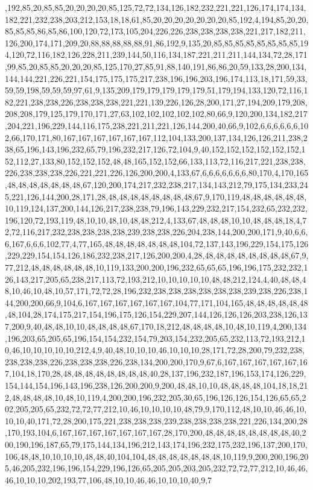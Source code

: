 ,192,85,20,85,85,20,20,20,20,85,125,72,72,134,126,182,232,221,221,126,174,174,134,182,221,232,238,203,212,153,18,18,61,85,20,20,20,20,20,20,20,85,192,4,194,85,20,20,85,85,85,86,85,86,100,120,72,173,105,204,226,226,238,238,238,238,221,217,182,211,126,200,174,171,209,20,88,88,88,88,88,91,86,192,9,135,20,85,85,85,85,85,85,85,85,194,120,72,116,182,126,228,211,239,144,50,116,134,187,221,211,211,144,134,72,28,171,99,85,20,85,85,20,20,20,85,125,170,27,85,91,88,140,191,86,86,20,59,133,28,200,134,144,144,221,226,221,154,175,175,175,217,238,196,196,203,196,174,113,18,171,59,33,59,59,198,59,59,59,97,61,9,135,209,179,179,179,179,179,51,179,194,133,120,72,116,182,221,238,238,226,238,238,238,221,221,139,226,126,28,200,171,27,194,209,179,208,208,208,179,125,179,170,171,27,63,102,102,102,102,102,80,66,9,120,200,134,182,217,204,221,196,229,144,116,175,238,221,211,221,126,144,200,40,66,9,102,6,6,6,6,6,6,102,66,170,171,80,167,167,167,167,167,167,112,104,133,200,137,134,126,126,211,238,238,65,196,143,196,232,65,79,196,232,217,126,72,104,9,40,152,152,152,152,152,152,152,112,27,133,80,152,152,152,48,48,165,152,152,66,133,113,72,116,217,221,238,238,226,238,238,238,226,221,221,226,126,200,200,4,133,67,6,6,6,6,6,6,6,80,170,4,170,165,48,48,48,48,48,48,48,67,120,200,174,217,232,238,217,134,143,212,79,175,134,233,245,221,126,144,200,28,171,28,48,48,48,48,48,48,48,48,67,9,170,119,48,48,48,48,48,48,10,119,124,137,200,144,126,217,238,238,79,196,143,229,232,217,154,232,65,232,232,196,120,72,193,119,48,10,10,48,10,48,48,212,4,133,67,48,48,48,10,10,48,48,48,18,4,72,72,116,217,232,238,238,238,238,239,238,238,226,204,238,144,200,200,171,9,40,6,6,6,167,6,6,6,102,77,4,77,165,48,48,48,48,48,48,48,104,72,137,143,196,229,154,175,126,229,229,154,154,126,186,232,238,217,126,200,200,4,28,48,48,48,48,48,48,48,48,67,9,77,212,48,48,48,48,48,48,10,119,133,200,200,196,232,65,65,65,196,196,175,232,232,126,143,217,205,65,238,217,113,72,193,212,10,10,10,10,10,48,48,212,124,4,40,48,48,48,10,46,10,48,10,57,171,72,72,28,196,232,238,238,238,238,238,238,239,238,226,238,144,200,200,66,9,104,6,167,167,167,167,167,167,104,77,171,104,165,48,48,48,48,48,48,48,104,28,174,175,217,154,196,175,126,154,229,207,144,126,126,126,203,238,126,137,200,9,40,48,48,10,10,48,48,48,48,67,170,18,212,48,48,48,48,10,48,10,119,4,200,134,196,203,65,205,65,196,154,154,232,154,79,203,154,232,205,65,232,113,72,193,212,10,46,10,10,10,10,10,212,4,9,40,48,10,10,10,46,10,10,10,28,171,72,28,200,79,232,238,238,238,238,226,238,238,238,226,238,134,200,200,170,9,67,6,167,167,167,167,167,167,104,18,170,28,48,48,48,48,48,48,48,48,40,28,137,196,232,187,196,153,174,126,229,154,144,154,196,143,196,238,126,200,200,9,200,48,48,10,10,48,48,48,48,104,18,18,212,48,48,48,48,10,48,10,119,4,200,200,196,232,205,30,65,196,126,126,154,126,65,65,202,205,205,65,232,72,72,77,212,10,46,10,10,10,10,48,79,9,170,112,48,10,10,46,46,10,10,10,40,171,72,28,200,175,221,238,238,238,239,238,238,238,238,221,226,134,200,28,170,193,104,6,167,167,167,167,167,167,167,28,170,200,48,48,48,48,48,48,48,48,40,200,190,196,187,65,79,175,144,134,196,212,143,174,196,232,175,232,196,137,200,170,106,48,48,10,10,10,10,48,48,40,104,104,48,48,48,48,48,48,48,10,119,9,200,200,196,205,46,205,232,196,196,154,229,196,126,65,205,205,203,205,232,72,72,77,212,10,46,46,46,10,10,10,202,193,77,106,48,10,10,46,46,10,10,10,40,9,7